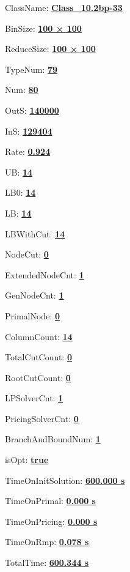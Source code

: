 \documentclass[11pt]{article}
\begin{document}
\pagestyle{empty}


ClassName: \underline{\textbf{Class_10.2bp-33}}
\par
BinSize: \underline{\textbf{100 × 100}}
\par
ReduceSize: \underline{\textbf{100 × 100}}
\par
TypeNum: \underline{\textbf{79}}
\par
Num: \underline{\textbf{80}}
\par
OutS: \underline{\textbf{140000}}
\par
InS: \underline{\textbf{129404}}
\par
Rate: \underline{\textbf{0.924}}
\par
UB: \underline{\textbf{14}}
\par
LB0: \underline{\textbf{14}}
\par
LB: \underline{\textbf{14}}
\par
LBWithCut: \underline{\textbf{14}}
\par
NodeCut: \underline{\textbf{0}}
\par
ExtendedNodeCnt: \underline{\textbf{1}}
\par
GenNodeCnt: \underline{\textbf{1}}
\par
PrimalNode: \underline{\textbf{0}}
\par
ColumnCount: \underline{\textbf{14}}
\par
TotalCutCount: \underline{\textbf{0}}
\par
RootCutCount: \underline{\textbf{0}}
\par
LPSolverCnt: \underline{\textbf{1}}
\par
PricingSolverCnt: \underline{\textbf{0}}
\par
BranchAndBoundNum: \underline{\textbf{1}}
\par
isOpt: \underline{\textbf{true}}
\par
TimeOnInitSolution: \underline{\textbf{600.000 s}}
\par
TimeOnPrimal: \underline{\textbf{0.000 s}}
\par
TimeOnPricing: \underline{\textbf{0.000 s}}
\par
TimeOnRmp: \underline{\textbf{0.078 s}}
\par
TotalTime: \underline{\textbf{600.344 s}}
\par
\newpage


\end{document}
